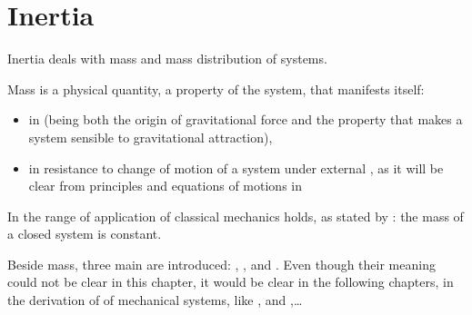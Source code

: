 \documentclass[letterpaper,10pt,english]{jupyterBook}
\begin{document}
\sphinxstepscope


\chapter{Inertia}
\label{\detokenize{ch/inertia:inertia}}\label{\detokenize{ch/inertia:classical-mechanics-inertia}}\label{\detokenize{ch/inertia::doc}}
\sphinxAtStartPar
Inertia deals with mass and mass distribution of systems.

\sphinxAtStartPar
{} Mass is a physical quantity, a property of the system, that manifests itself:
\begin{itemize}
\item {} 
\sphinxAtStartPar
in {\hyperref[\detokenize{ch/actions-examples:classical-mechanics-actions-gravitation}]{}} (being both the origin of gravitational force and the property that makes a system sensible to gravitational attraction),

\item {} 
\sphinxAtStartPar
in resistance to change of motion of a system under external {\hyperref[\detokenize{ch/actions:classical-mechanics-actions}]{}}, as it will be clear from principles and equations of motions in {\hyperref[\detokenize{ch/dynamics:classical-mechanics-dynamics}]{}}

\end{itemize}

\sphinxAtStartPar
In the range of application of classical mechanics  holds, as stated by : the mass of a closed system is constant.

\sphinxAtStartPar
Beside mass, three main  are introduced: , , and . Even though their meaning could not be clear in this chapter, it would be clear in the following chapters, in the derivation of {\hyperref[\detokenize{ch/dynamics-eom:classical-mechanics-dynamics-eom-eom}]{}} of mechanical systems, like {\hyperref[\detokenize{ch/dynamics-eom-point:classical-mechanics-dynamics-eom-point}]{}}, {\hyperref[\detokenize{ch/dynamics-eom-points:classical-mechanics-dynamics-eom-points}]{}} and {\hyperref[\detokenize{ch/dynamics-eom-rigid:classical-mechanics-dynamics-eom-rigid}]{}},…
\end{document}
